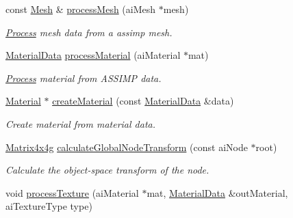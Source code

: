 \begin{Indent}
\begin{DoxyCompactItemize}
const \mbox{\hyperlink{classrev_1_1_mesh}{Mesh}} \& \mbox{\hyperlink{classrev_1_1_model_reader_a0c82cee6bd17b57abe2e1594f661e037}{process\+Mesh}} (ai\+Mesh $\ast$mesh)
\begin{DoxyCompactList}\small\item\em \mbox{\hyperlink{classrev_1_1_process}{Process}} mesh data from a assimp mesh. \end{DoxyCompactList}\item 
\mbox{\label{classrev_1_1_model_reader_a77ddb9065e462c65377645d418bdb8fc}} 
\mbox{\hyperlink{structrev_1_1_material_data}{Material\+Data}} \mbox{\hyperlink{classrev_1_1_model_reader_a77ddb9065e462c65377645d418bdb8fc}{process\+Material}} (ai\+Material $\ast$mat)
\begin{DoxyCompactList}\small\item\em \mbox{\hyperlink{classrev_1_1_process}{Process}} material from A\+S\+S\+I\+MP data. \end{DoxyCompactList}\item 
\mbox{\label{classrev_1_1_model_reader_a5636b04056abe0509ba8decabaa6f3be}} 
\mbox{\hyperlink{classrev_1_1_material}{Material}} $\ast$ \mbox{\hyperlink{classrev_1_1_model_reader_a5636b04056abe0509ba8decabaa6f3be}{create\+Material}} (const \mbox{\hyperlink{structrev_1_1_material_data}{Material\+Data}} \&data)
\begin{DoxyCompactList}\small\item\em Create material from material data. \end{DoxyCompactList}\item 
\mbox{\label{classrev_1_1_model_reader_a79cef366af128f72f76326507a8b5da0}} 
\mbox{\hyperlink{classrev_1_1_square_matrix}{Matrix4x4g}} \mbox{\hyperlink{classrev_1_1_model_reader_a79cef366af128f72f76326507a8b5da0}{calculate\+Global\+Node\+Transform}} (const ai\+Node $\ast$root)
\begin{DoxyCompactList}\small\item\em Calculate the object-\/space transform of the node. \end{DoxyCompactList}\item 
void \mbox{\hyperlink{classrev_1_1_model_reader_a8e7deec3987f6f7aa0537f43af5609d0}{process\+Texture}} (ai\+Material $\ast$mat, \mbox{\hyperlink{structrev_1_1_material_data}{Material\+Data}} \&out\+Material, ai\+Texture\+Type type)

\end{DoxyCompactItemize}
\end{Indent}
